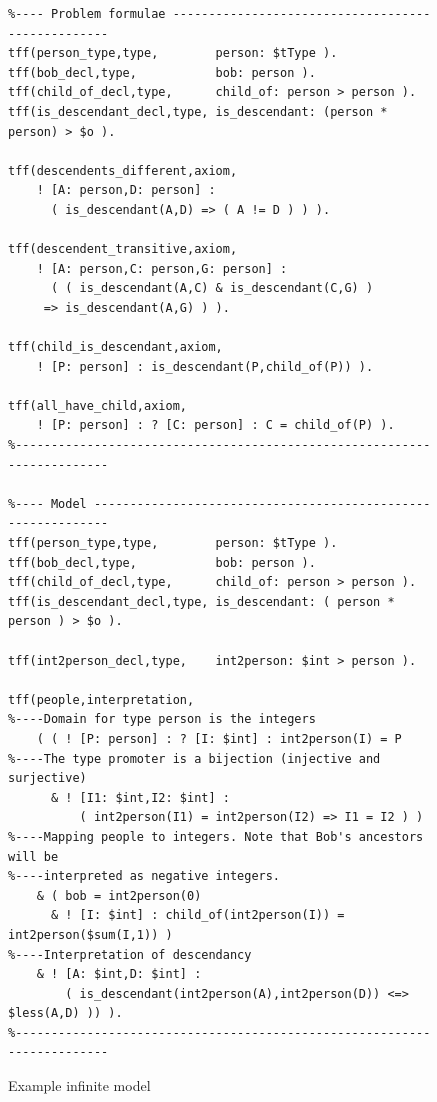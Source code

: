 \documentclass[runningheads]{llncs}
\begin{document}
\begin{figure}[h!]
\centering
{\footnotesize
{\setlength{\baselineskip}{3mm}
\begin{verbatim}
%---- Problem formulae --------------------------------------------------
tff(person_type,type,        person: $tType ).
tff(bob_decl,type,           bob: person ).
tff(child_of_decl,type,      child_of: person > person ).
tff(is_descendant_decl,type, is_descendant: (person * person) > $o ).

tff(descendents_different,axiom,
    ! [A: person,D: person] : 
      ( is_descendant(A,D) => ( A != D ) ) ).

tff(descendent_transitive,axiom,
    ! [A: person,C: person,G: person] :
      ( ( is_descendant(A,C) & is_descendant(C,G) ) 
     => is_descendant(A,G) ) ).

tff(child_is_descendant,axiom,
    ! [P: person] : is_descendant(P,child_of(P)) ).

tff(all_have_child,axiom,
    ! [P: person] : ? [C: person] : C = child_of(P) ).
%------------------------------------------------------------------------

%---- Model -------------------------------------------------------------
tff(person_type,type,        person: $tType ).
tff(bob_decl,type,           bob: person ).
tff(child_of_decl,type,      child_of: person > person ).
tff(is_descendant_decl,type, is_descendant: ( person * person ) > $o ).

tff(int2person_decl,type,    int2person: $int > person ).

tff(people,interpretation,
%----Domain for type person is the integers
    ( ( ! [P: person] : ? [I: $int] : int2person(I) = P
%----The type promoter is a bijection (injective and surjective)
      & ! [I1: $int,I2: $int] : 
          ( int2person(I1) = int2person(I2) => I1 = I2 ) )
%----Mapping people to integers. Note that Bob's ancestors will be 
%----interpreted as negative integers.
    & ( bob = int2person(0)
      & ! [I: $int] : child_of(int2person(I)) = int2person($sum(I,1)) )
%----Interpretation of descendancy
    & ! [A: $int,D: $int] : 
        ( is_descendant(int2person(A),int2person(D)) <=> $less(A,D) )) ).
%------------------------------------------------------------------------
\end{verbatim}
}}
\caption{Example infinite model}
\label{ExampleModel}
\end{figure}
\end{document}
